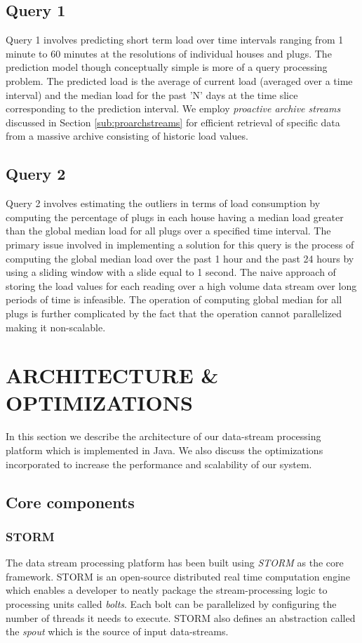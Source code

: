 \documentclass{sig-alternate}
\begin{document}
\subsection{Query 1}
\label{sub:query 1}
Query 1 involves predicting short term load over time intervals ranging from 1 minute to 60 minutes at the resolutions of individual houses and plugs. The prediction model though conceptually simple is more of a query processing problem. The predicted load is the average of current load (averaged over a time interval) and the median load for the past 'N' days at the time slice  corresponding to the prediction interval. We employ {\it proactive archive streams} discussed in Section \ref{sub:proarchstreams} for efficient retrieval of specific data from a massive archive consisting of historic load values. 


\subsection{Query 2}
\label{sub:query 2}
Query 2 involves estimating the outliers in terms of load consumption by computing the percentage of plugs in each house having a median load greater than the global median load for all plugs  over a specified time interval. The primary issue involved in implementing a solution for this query is the process of computing the global median load over the past 1 hour and the past 24 hours by using a sliding window with a slide equal to 1 second. The naive approach of storing the load values for each reading over a high volume data stream over long periods of time is  infeasible. The operation of computing global median for all plugs is further complicated by the fact that the operation cannot parallelized making it non-scalable. 

\section{ARCHITECTURE \& OPTIMIZATIONS}
\label{sec:architecture}
In this section we describe the architecture of our data-stream processing platform which is implemented in Java. We also discuss the optimizations incorporated to increase the performance and scalability of our system.

\subsection{Core components}

\subsubsection{STORM}
\label{subsub:storm}
The data stream processing platform has been built using {\it STORM} as the core framework. STORM is an open-source distributed real time computation engine which enables a developer to neatly package the stream-processing logic to processing units called {\it bolts}. Each bolt can be parallelized by configuring the number of threads it needs to execute. STORM also defines an abstraction called the {\it spout} which is the source of input data-streams.
\end{document}
